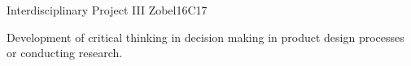 \begin{syllabus}
\begin{unit}{Interdisciplinary Project  III }{}{Zobel}{16}{C17}
\begin{learningoutcomes}
   \item Development of critical thinking in decision making in product design processes or conducting research.
\end{learningoutcomes}
\end{unit}



\begin{coursebibliography}
\end{coursebibliography}

\end{syllabus}
